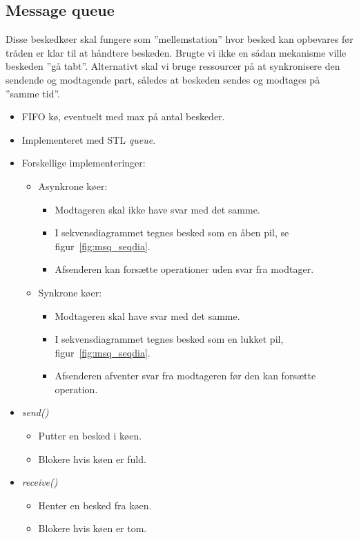 \subsection{Message queue}
Disse beskedkøer skal fungere som ''mellemstation'' hvor besked kan opbevares før tråden er klar til at håndtere beskeden. Brugte vi ikke en sådan mekanisme ville beskeden ''gå tabt''. Alternativt skal vi bruge ressourcer på at synkronisere den sendende og modtagende part, således at beskeden sendes og modtages på ''samme tid''.


\begin{itemize}
	\item FIFO kø, eventuelt med max på antal beskeder.
	\item Implementeret med STL \textit{queue}.
	\item Forskellige implementeringer:
	\begin{itemize}
		\item Asynkrone køer:
		\begin{itemize}
			\item Modtageren skal ikke have svar med det samme.
			\item I sekvensdiagrammet tegnes besked som en åben pil, se figur~\ref{fig:msq_seqdia}.
			\item Afsenderen kan forsætte operationer uden svar fra modtager.
		\end{itemize}
		\item Synkrone køer:
		\begin{itemize}
			\item Modtageren skal have svar med det samme.
			\item I sekvensdiagrammet tegnes besked som en lukket pil, figur~\ref{fig:msq_seqdia}.
			\item Afsenderen afventer svar fra modtageren før den kan forsætte operation.
		\end{itemize}
	\end{itemize}
	\item \textit{send()}
	\begin{itemize}
		\item Putter en besked i køen.
		\item Blokere hvis køen er fuld.
	\end{itemize}
	\item \textit{receive()}
	\begin{itemize}
		\item Henter en besked fra køen.
		\item Blokere hvis køen er tom.
	\end{itemize}
\end{itemize}


